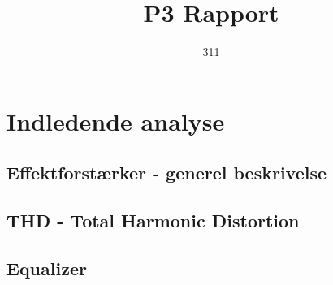 

\title{P3 Rapport}
\author{311}


\thispagestyle{empty}


\thispagestyle{empty}
\newpage
\mbox{}
\thispagestyle{empty}
\mbox{}
\newpage

\newpage


\newpage
\thispagestyle{empty}
\mbox{}
\newpage





\thispagestyle{empty}
\mbox{}

\newpage
\tableofcontents*

\setpagewiselinenumbers
\modulolinenumbers[5]
\linenumbers



\chapter{Indledende analyse}
\section{Effektforstærker - generel beskrivelse}
\section{THD - Total Harmonic Distortion}
\section{Equalizer}

















\listoffixmes


